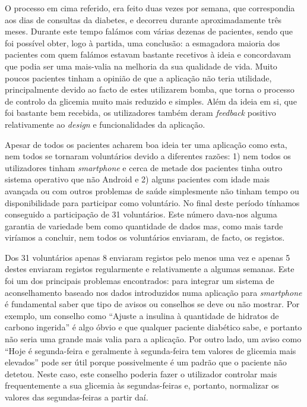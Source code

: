 O processo em cima referido, era feito duas vezes por semana, que correspondia aos dias de consultas da diabetes, e decorreu durante aproximadamente três meses. Durante este tempo falámos com várias dezenas de pacientes, sendo que foi possível obter, logo à partida, uma conclusão: a esmagadora maioria dos pacientes com quem falámos estavam bastante recetivos à ideia e concordavam que podia ser uma mais-valia na melhoria da sua qualidade de vida. Muito poucos pacientes tinham a opinião de que a aplicação não teria utilidade, principalmente devido ao facto de estes utilizarem bomba, que torna o processo de controlo da glicemia muito mais reduzido e simples.
Além da ideia em si, que foi bastante bem recebida, os utilizadores também deram \textit{feedback} positivo relativamente ao \textit{design} e funcionalidades da aplicação. 

Apesar de todos os pacientes acharem boa ideia ter uma aplicação como esta, nem todos se tornaram voluntários devido a diferentes razões: 1) nem todos os utilizadores tinham \textit{smartphone} e cerca de metade dos pacientes tinha outro sistema operativo que não Android e 2) alguns pacientes com idade mais avançada ou com outros problemas de saúde simplesmente não tinham tempo ou disponibilidade para participar como voluntário. 
No final deste período tínhamos conseguido a participação de 31 voluntários. Este número dava-nos alguma garantia de variedade bem como quantidade de dados mas, como mais tarde viríamos a concluir, nem todos os voluntários enviaram, de facto, os registos.

Dos 31 voluntários apenas 8 enviaram registos pelo menos uma vez e apenas 5 destes enviaram registos regularmente e relativamente a algumas semanas. Este foi um dos principais problemas encontrados: para integrar um sistema de aconselhamento baseado nos dados introduzidos numa aplicação para \textit{smartphone} é fundamental saber que tipo de avisos ou conselhos se deve ou não mostrar. Por exemplo, um conselho como ``Ajuste a insulina à quantidade de hidratos de carbono ingerida'' é algo óbvio e que qualquer paciente diabético sabe, e portanto não seria uma grande mais valia para a aplicação. Por outro lado, um aviso como ``Hoje é segunda-feira e geralmente à segunda-feira tem valores de glicemia mais elevados'' pode ser útil porque possivelmente é um padrão que o paciente não detetou. Neste caso, este conselho poderia fazer o utilizador controlar mais frequentemente a sua glicemia às segundas-feiras e, portanto, normalizar os valores das segundas-feiras a partir daí. 

